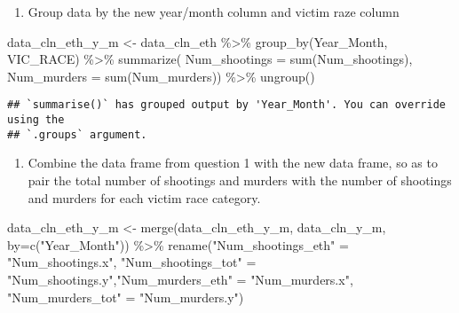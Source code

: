 \documentclass[
]{article}
\newenvironment{Shaded}{\begin{snugshade}}{\end{snugshade}}
\newcommand{\AttributeTok}[1]{\textcolor[rgb]{0.77,0.63,0.00}{#1}}
\newcommand{\FunctionTok}[1]{\textcolor[rgb]{0.00,0.00,0.00}{#1}}
\newcommand{\NormalTok}[1]{#1}
\newcommand{\OtherTok}[1]{\textcolor[rgb]{0.56,0.35,0.01}{#1}}
\newcommand{\SpecialCharTok}[1]{\textcolor[rgb]{0.00,0.00,0.00}{#1}}
\newcommand{\StringTok}[1]{\textcolor[rgb]{0.31,0.60,0.02}{#1}}
\providecommand{\tightlist}{%
  \setlength{\itemsep}{0pt}\setlength{\parskip}{0pt}}
\begin{document}
\begin{enumerate}
\def\labelenumi{\arabic{enumi})}
\setcounter{enumi}{2}
\tightlist
\item
  Group data by the new year/month column and victim raze column
\end{enumerate}

\begin{Shaded}
\begin{Highlighting}[]
\NormalTok{data\_cln\_eth\_y\_m }\OtherTok{\textless{}{-}}\NormalTok{ data\_cln\_eth }\SpecialCharTok{\%\textgreater{}\%} \FunctionTok{group\_by}\NormalTok{(Year\_Month, VIC\_RACE) }\SpecialCharTok{\%\textgreater{}\%} \FunctionTok{summarize}\NormalTok{( }\AttributeTok{Num\_shootings =} \FunctionTok{sum}\NormalTok{(Num\_shootings), }\AttributeTok{Num\_murders =} \FunctionTok{sum}\NormalTok{(Num\_murders)) }\SpecialCharTok{\%\textgreater{}\%} \FunctionTok{ungroup}\NormalTok{()}
\end{Highlighting}
\end{Shaded}

\begin{verbatim}
## `summarise()` has grouped output by 'Year_Month'. You can override using the
## `.groups` argument.
\end{verbatim}

\begin{enumerate}
\def\labelenumi{\arabic{enumi}.}
\setcounter{enumi}{3}
\tightlist
\item
  Combine the data frame from question 1 with the new data frame, so as
  to pair the total number of shootings and murders with the number of
  shootings and murders for each victim race category.
\end{enumerate}

\begin{Shaded}
\begin{Highlighting}[]
\NormalTok{data\_cln\_eth\_y\_m }\OtherTok{\textless{}{-}} \FunctionTok{merge}\NormalTok{(data\_cln\_eth\_y\_m, data\_cln\_y\_m, }\AttributeTok{by=}\FunctionTok{c}\NormalTok{(}\StringTok{"Year\_Month"}\NormalTok{)) }\SpecialCharTok{\%\textgreater{}\%} \FunctionTok{rename}\NormalTok{(}\StringTok{"Num\_shootings\_eth"} \OtherTok{=} \StringTok{"Num\_shootings.x"}\NormalTok{, }\StringTok{"Num\_shootings\_tot"} \OtherTok{=} \StringTok{"Num\_shootings.y"}\NormalTok{,}\StringTok{"Num\_murders\_eth"} \OtherTok{=} \StringTok{"Num\_murders.x"}\NormalTok{, }\StringTok{"Num\_murders\_tot"} \OtherTok{=} \StringTok{"Num\_murders.y"}\NormalTok{)}
\end{Highlighting}
\end{Shaded}
\end{document}
